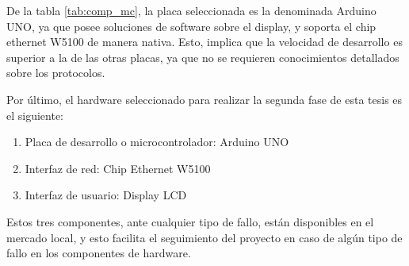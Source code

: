 \renewcommand{\arraystretch}{1.2}
\begin{table}[ht]
\caption{Cuadro comparativo de placas disponibles en el Instituto Argentino de radioastronomía}
\label{tab:comp_mc}
\end{table} 





De la tabla \ref{tab:comp_mc}, la placa seleccionada es la denominada Arduino UNO, ya que posee soluciones de software sobre el display, y soporta el chip ethernet W5100 de manera nativa. Esto, implica que la velocidad de desarrollo es superior a la de las otras placas, ya que no se requieren conocimientos detallados sobre los protocolos. 

Por último, el hardware seleccionado para realizar la segunda fase de esta tesis es el siguiente: 
\begin{enumerate}
	\item Placa de desarrollo o microcontrolador: Arduino UNO 
	\item Interfaz de red: Chip Ethernet W5100 
	\item Interfaz de usuario: Display LCD  
\end{enumerate}

Estos tres componentes, ante cualquier tipo de fallo, están disponibles en el mercado local, y esto facilita el seguimiento del proyecto en caso de algún tipo de fallo en los componentes de hardware. 


